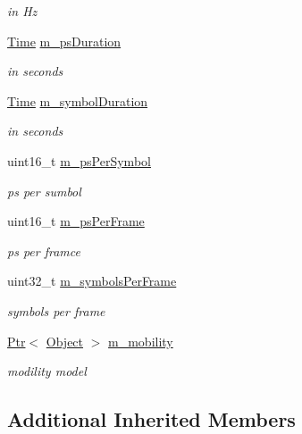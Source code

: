 \begin{DoxyCompactItemize}
\begin{DoxyCompactList}\small\item\em in Hz \end{DoxyCompactList}\item 
\hyperlink{classns3_1_1Time}{Time} \hyperlink{classns3_1_1WimaxPhy_a351d08e3a363ea71f26f7cf32bc330f3}{m\+\_\+ps\+Duration}
\begin{DoxyCompactList}\small\item\em in seconds \end{DoxyCompactList}\item 
\hyperlink{classns3_1_1Time}{Time} \hyperlink{classns3_1_1WimaxPhy_aac5780864b59d5c6fab2d99ec86273e6}{m\+\_\+symbol\+Duration}
\begin{DoxyCompactList}\small\item\em in seconds \end{DoxyCompactList}\item 
uint16\+\_\+t \hyperlink{classns3_1_1WimaxPhy_accc69cb85b91c88901ae1b0b0bc02480}{m\+\_\+ps\+Per\+Symbol}
\begin{DoxyCompactList}\small\item\em ps per sumbol \end{DoxyCompactList}\item 
uint16\+\_\+t \hyperlink{classns3_1_1WimaxPhy_a3b0aef55186ffdae4e0d4134407c93c7}{m\+\_\+ps\+Per\+Frame}
\begin{DoxyCompactList}\small\item\em ps per framce \end{DoxyCompactList}\item 
uint32\+\_\+t \hyperlink{classns3_1_1WimaxPhy_a48129f266177bc3f07781364aefb2e34}{m\+\_\+symbols\+Per\+Frame}
\begin{DoxyCompactList}\small\item\em symbols per frame \end{DoxyCompactList}\item 
\hyperlink{classns3_1_1Ptr}{Ptr}$<$ \hyperlink{classns3_1_1Object}{Object} $>$ \hyperlink{classns3_1_1WimaxPhy_a308b3704d8db362c89d52d79c4ab0e04}{m\+\_\+mobility}
\begin{DoxyCompactList}\small\item\em modility model \end{DoxyCompactList}\end{DoxyCompactItemize}
\subsection*{Additional Inherited Members}


